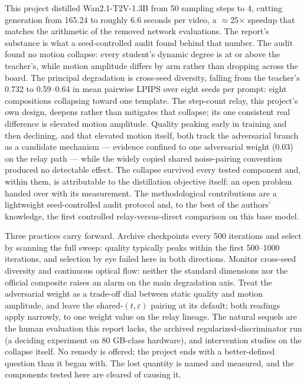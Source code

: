 \documentclass[11pt,a4paper]{article}
\begin{document}
This project distilled Wan2.1-T2V-1.3B from 50 sampling steps to 4, cutting generation from 165.24 to roughly 6.6 seconds per video, a $\approx$25$\times$ speedup that matches the arithmetic of the removed network evaluations. The report's substance is what a seed-controlled audit found behind that number. The audit found no motion collapse: every student's dynamic degree is at or above the teacher's, while motion amplitude differs by arm rather than dropping across the board. The principal degradation is cross-seed diversity, falling from the teacher's 0.732 to 0.59–0.64 in mean pairwise LPIPS over eight seeds per prompt: eight compositions collapsing toward one template. The step-count relay, this project's own design, deepens rather than mitigates that collapse; its one consistent real difference is elevated motion amplitude. Quality peaking early in training and then declining, and that elevated motion itself, both track the adversarial branch as a candidate mechanism — evidence confined to one adversarial weight (0.03) on the relay path — while the widely copied shared noise-pairing convention produced no detectable effect. The collapse survived every tested component and, within them, is attributable to the distillation objective itself: an open problem handed over with its measurement. The methodological contributions are a lightweight seed-controlled audit protocol and, to the best of the authors' knowledge, the first controlled relay-versus-direct comparison on this base model.

Three practices carry forward. Archive checkpoints every 500 iterations and select by scanning the full sweep: quality typically peaks within the first 500–1000 iterations, and selection by eye failed here in both directions. Monitor cross-seed diversity and continuous optical flow: neither the standard dimensions nor the official composite raises an alarm on the main degradation axis. Treat the adversarial weight as a trade-off dial between static quality and motion amplitude, and leave the shared-$(t, \varepsilon)$ pairing at its default; both readings apply narrowly, to one weight value on the relay lineage. The natural sequels are the human evaluation this report lacks, the archived regularized-discriminator run (a deciding experiment on 80 GB-class hardware), and intervention studies on the collapse itself. No remedy is offered; the project ends with a better-defined question than it began with. The lost quantity is named and measured, and the components tested here are cleared of causing it.
\end{document}
